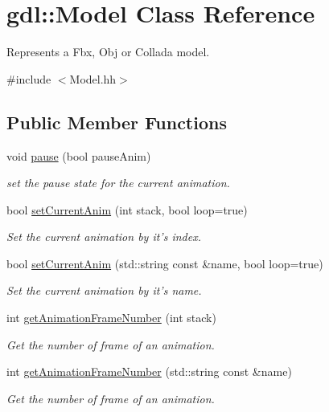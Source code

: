 \hypertarget{classgdl_1_1_model}{\section{gdl\-:\-:Model Class Reference}
\label{classgdl_1_1_model}
}


Represents a Fbx, Obj or Collada model.  




{\ttfamily \#include $<$Model.\-hh$>$}

\subsection*{Public Member Functions}
\begin{DoxyCompactItemize}
\item 
void \hyperlink{classgdl_1_1_model_a2880a8151a0a076dccc17c8a12530dcc}{pause} (bool pause\-Anim)
\begin{DoxyCompactList}\small\item\em set the pause state for the current animation. \end{DoxyCompactList}\item 
bool \hyperlink{classgdl_1_1_model_a223b04dc9a2007ac22cc71d019af5749}{set\-Current\-Anim} (int stack, bool loop=true)
\begin{DoxyCompactList}\small\item\em Set the current animation by it's index. \end{DoxyCompactList}\item 
bool \hyperlink{classgdl_1_1_model_ac4210edf1cfc619f8948e83820b41ca9}{set\-Current\-Anim} (std\-::string const \&name, bool loop=true)
\begin{DoxyCompactList}\small\item\em Set the current animation by it's name. \end{DoxyCompactList}\item 
int \hyperlink{classgdl_1_1_model_a6c07ff9af9e5f21976f74c76969c5209}{get\-Animation\-Frame\-Number} (int stack)
\begin{DoxyCompactList}\small\item\em Get the number of frame of an animation. \end{DoxyCompactList}\item 
int \hyperlink{classgdl_1_1_model_a2f46e23c1f5bbf46724ab88d4e09edeb}{get\-Animation\-Frame\-Number} (std\-::string const \&name)
\begin{DoxyCompactList}\small\item\em Get the number of frame of an animation. \end{DoxyCompactList}\item 

\end{DoxyCompactItemize}
